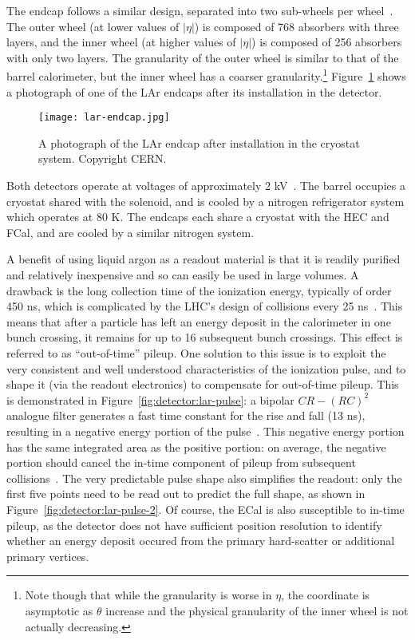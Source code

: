 


The endcap follows a similar design, separated into two sub-wheels per wheel~\cite{ATLASPaper}. The outer wheel (at lower values of $|\eta|$) is composed of 768 absorbers with three layers, and the inner wheel (at higher values of $|\eta|$) is composed of 256 absorbers with only two layers. The granularity of the outer wheel is similar to that of the barrel calorimeter, but the inner wheel has a coarser granularity.\footnote{Note though that while the granularity is worse in $\eta$, the coordinate is asymptotic as $\theta$ increase and the physical granularity of the inner wheel is not actually decreasing.} Figure~\ref{fig:detector:lar-endcap} shows a photograph of one of the LAr endcaps after its installation in the detector.



\begin{figure}
\centering
\texttt{[image: lar-endcap.jpg]}
\label{fig:detector:lar-endcap}
\caption{A photograph of the LAr endcap after installation in the cryostat system. Copyright CERN.}
\end{figure}


Both detectors operate at voltages of approximately 2 kV~\cite{ATLASPaper}. The barrel occupies a cryostat shared with the solenoid, and is cooled by a nitrogen refrigerator system which operates at 80 K. The endcaps each share a cryostat with the HEC and FCal, and are cooled by a similar nitrogen system.

A benefit of using liquid argon as a readout material is that it is readily purified and relatively inexpensive and so can easily be used in large volumes. A drawback is the long collection time of the ionization energy, typically of order 450 ns, which is complicated by the LHC's design of collisions every 25 ns~\cite{ATLASPaper,LARPaper}. This means that after a particle has left an energy deposit in the calorimeter in one bunch crossing, it remains for up to 16 subsequent bunch crossings. This effect is referred to as ``out-of-time'' pileup. One solution to this issue is to exploit the very consistent and well understood characteristics of the ionization pulse, and to shape it (via the readout electronics) to compensate for out-of-time pileup. This is demonstrated in Figure~\ref{fig:detector:lar-pulse}: a bipolar $CR -(RC)^2$ analogue filter generates a fast time constant for the rise and fall (13 ns), resulting in a negative energy portion of the pulse~\cite{LARPaper}. This negative energy portion has the same integrated area as the positive portion: on average, the negative portion should cancel the in-time component of pileup from subsequent collisions~\cite{Loch}. The very predictable pulse shape also simplifies the readout: only the first five points need to be read out to predict the full shape, as shown in Figure~\ref{fig:detector:lar-pulse-2}. Of course, the ECal is also susceptible to in-time pileup, as the detector does not have sufficient position resolution to identify whether an energy deposit occured from the primary hard-scatter or additional primary vertices.


